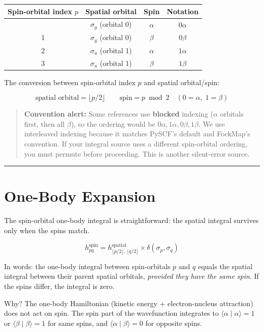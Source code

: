 \documentclass[
  11pt,
  oneside]{book}
\begin{document}
\begin{longtable}[]{@{}cccc@{}}
\toprule\noalign{}
Spin-orbital index \(p\) & Spatial orbital & Spin & Notation \\
\midrule\noalign{}
\endhead
\bottomrule\noalign{}
\endlastfoot
0 & \(\sigma_g\) (orbital 0) & \(\alpha\) & \(0\alpha\) \\
1 & \(\sigma_g\) (orbital 0) & \(\beta\) & \(0\beta\) \\
2 & \(\sigma_u\) (orbital 1) & \(\alpha\) & \(1\alpha\) \\
3 & \(\sigma_u\) (orbital 1) & \(\beta\) & \(1\beta\) \\
\end{longtable}

The conversion between spin-orbital index \(p\) and spatial
orbital/spin:

\[\text{spatial orbital} = \lfloor p/2 \rfloor \qquad \text{spin} = p \bmod 2 \quad (0 = \alpha,\; 1 = \beta)\]

\begin{quote}
\textbf{Convention alert:} Some references use \textbf{blocked} indexing
(\(\alpha\) orbitals first, then all \(\beta\)), so the ordering would
be \(0\alpha, 1\alpha, 0\beta, 1\beta\). We use interleaved indexing
because it matches PySCF's default and FockMap's convention. If your
integral source uses a different spin-orbital ordering, you must permute
before proceeding. This is another silent-error source.
\end{quote}

\begin{center}\rule{0.5\linewidth}{0.5pt}\end{center}

\section{One-Body Expansion}\label{one-body-expansion}

The spin-orbital one-body integral is straightforward: the spatial
integral survives only when the spins match.

\[h^{\text{spin}}_{pq} = h^{\text{spatial}}_{\lfloor p/2 \rfloor,\, \lfloor q/2 \rfloor} \times \delta(\sigma_p, \sigma_q)\]

In words: the one-body integral between spin-orbitals \(p\) and \(q\)
equals the spatial integral between their parent spatial orbitals,
\emph{provided they have the same spin}. If the spins differ, the
integral is zero.

Why? The one-body Hamiltonian (kinetic energy + electron-nucleus
attraction) does not act on spin. The spin part of the wavefunction
integrates to \(\langle \alpha \mid \alpha \rangle = 1\) or
\(\langle \beta \mid \beta \rangle = 1\) for same spins, and
\(\langle \alpha \mid \beta \rangle = 0\) for opposite spins.
\end{document}

